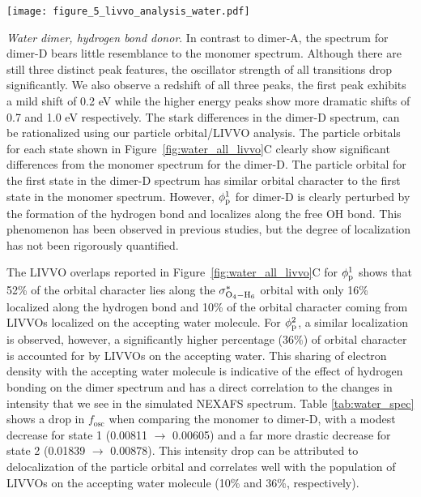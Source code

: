 \documentclass{article}
\begin{document}
\begin{figure*}
\texttt{[image: figure\_5\_livvo\_analysis\_water.pdf]}
\caption{Particle orbitals, valence virtual orbitals, and total valence character for each of the five core transitions in the NEXAFS spectrum of (A) water monomer, (B) the water dimer at the oxygen accepting the hydrogen bond, and (C) the water dimer at the oxygen donating the hydrogen bond.
Particle orbitals are numbered according to the calculated transitions reported in Table \ref{tab:water_spec} while atom numberings correspond to those shown in Figure~\ref{fig:water_spec}.}
\label{fig:water_all_livvo}
\end{figure*}

\textit{Water dimer, hydrogen bond donor}.
In contrast to dimer-A, the spectrum for dimer-D bears little resemblance to the monomer spectrum.
Although there are still three distinct peak features, the oscillator strength of all transitions drop significantly. We also observe a redshift of all three peaks, the first peak exhibits a mild shift of 0.2 eV while the higher energy peaks show more dramatic shifts of 0.7 and 1.0 eV respectively. The stark differences in the dimer-D spectrum, can be rationalized using our particle orbital/LIVVO analysis. The particle orbitals for each state shown in Figure~\ref{fig:water_all_livvo}C clearly show significant differences from the monomer spectrum for the dimer-D. The particle orbital for the first state in the dimer-D spectrum has similar orbital character to the first state in the monomer spectrum. However, $\phi_{\rm p}^1$ for dimer-D is clearly perturbed by the formation of the hydrogen bond and localizes along the free OH bond. 
This phenomenon has been observed in previous studies,\cite{fransson_requirements_2016,cavalleri_interpretation_2002} but the degree of localization has not been rigorously quantified. 

The LIVVO overlaps reported in Figure~\ref{fig:water_all_livvo}C for $\phi_{\rm p}^1$ shows that 52\% of the orbital character lies along the $\sigma^*_{\rm O_4-H_6}$ orbital with only 16\% localized along the hydrogen bond and 10\% of the orbital character coming from LIVVOs localized on the accepting water molecule. For $\phi_{\rm p}^2$, a similar localization is observed, however, a significantly higher percentage (36\%) of orbital character is accounted for by LIVVOs on the accepting water. This sharing of electron density with the accepting water molecule is indicative of the effect of hydrogen bonding on the dimer spectrum and has a direct correlation to the changes in intensity that we see in the simulated NEXAFS spectrum. Table \ref{tab:water_spec} shows a drop in $f_\mathrm{osc}$ when comparing the monomer to dimer-D, with a modest decrease for state 1 (0.00811 $\rightarrow$ 0.00605) and a far more drastic decrease for state 2 (0.01839 $\rightarrow$ 0.00878). This intensity drop can be attributed to delocalization of the particle orbital and correlates well with the population of LIVVOs on the accepting water molecule (10\% and 36\%, respectively).
\end{document}
